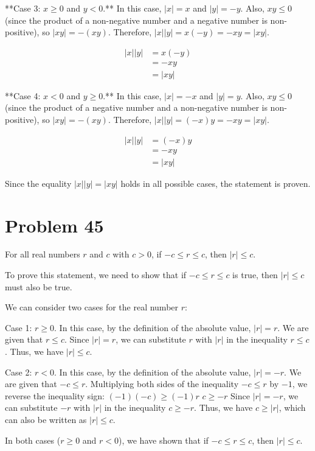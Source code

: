 \documentclass{article}
\begin{document}
**Case 3: $x \ge 0$ and $y < 0$.**
In this case, $|x| = x$ and $|y| = -y$.
Also, $xy \le 0$ (since the product of a non-negative number and a negative number is non-positive), so $|xy| = -(xy)$.
Therefore, $|x||y| = x(-y) = -xy = |xy|$.

\begin{align*} |x||y| &= x(-y) \\ &= -xy \\ &= |xy| \end{align*}

**Case 4: $x < 0$ and $y \ge 0$.**
In this case, $|x| = -x$ and $|y| = y$.
Also, $xy \le 0$ (since the product of a negative number and a non-negative number is non-positive), so $|xy| = -(xy)$.
Therefore, $|x||y| = (-x)y = -xy = |xy|$.

\begin{align*} |x||y| &= (-x)y \\ &= -xy \\ &= |xy| \end{align*}

Since the equality $|x||y| = |xy|$ holds in all possible cases, the statement is proven.

\newpage

\section*{Problem 45}
For all real numbers $r$ and $c$ with $c > 0$, if $-c \leq r \leq c$, then $|r| \leq c$.

To prove this statement, we need to show that if $-c \leq r \leq c$ is true, then $|r| \leq c$ must also be true.

We can consider two cases for the real number $r$:

Case 1: $r \geq 0$.
In this case, by the definition of the absolute value, $|r| = r$.
We are given that $r \leq c$.
Since $|r| = r$, we can substitute $r$ with $|r|$ in the inequality $r \leq c$.
Thus, we have $|r| \leq c$.

Case 2: $r < 0$.
In this case, by the definition of the absolute value, $|r| = -r$.
We are given that $-c \leq r$.
Multiplying both sides of the inequality $-c \leq r$ by $-1$, we reverse the inequality sign:
$(-1)(-c) \geq (-1)r$
$c \geq -r$
Since $|r| = -r$, we can substitute $-r$ with $|r|$ in the inequality $c \geq -r$.
Thus, we have $c \geq |r|$, which can also be written as $|r| \leq c$.

In both cases ($r \geq 0$ and $r < 0$), we have shown that if $-c \leq r \leq c$, then $|r| \leq c$.
\end{document}
